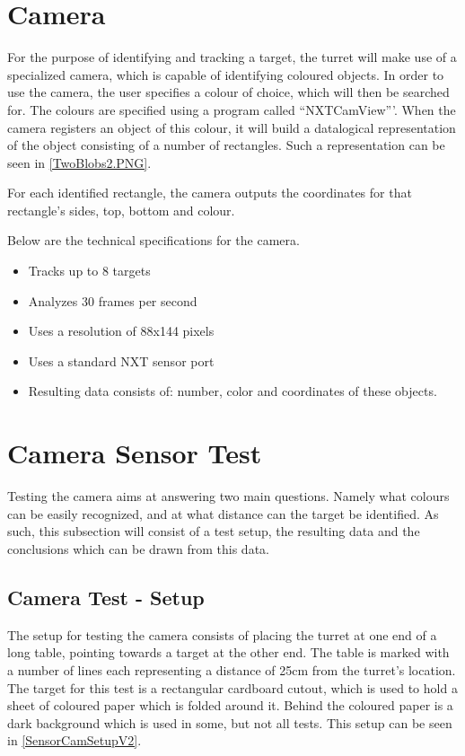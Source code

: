 \section{Camera}\label{SensorTheory}
For the purpose of identifying and tracking a target, the turret will
make use of a specialized camera, which is capable of identifying coloured
objects. In order to use the camera, the user specifies a colour of choice,
which will then be searched for. The colours are specified using a program
called ``NXTCamView'''. When the camera registers an object of this colour, it will
build a datalogical representation of the object consisting of a number of
rectangles. Such a representation can be seen in \autoref{TwoBlobs2.PNG}.


For each identified rectangle, the camera outputs the coordinates for that
rectangle's sides, top, bottom and colour. 

Below are the technical specifications \citep[p. 1]{NXTCam} for the camera.
\begin{itemize}
  \item Tracks up to 8 targets
  \item Analyzes 30 frames per second
  \item Uses a resolution of 88x144 pixels
  \item Uses a standard NXT sensor port
  \item Resulting data consists of: number, color and coordinates of these
  objects.
\end{itemize}

\section{Camera Sensor Test}\label{CamTest}%
Testing the camera aims at answering two main questions. Namely
what colours can be easily recognized, and at what distance can the target be
identified. As such, this subsection will consist of a test setup, the resulting
data and the conclusions which can be drawn from this data.

\subsection{Camera Test - Setup}\label{CamTestSetup}
The setup for testing the camera consists of placing the turret at one end of a
long table, pointing towards a target at the other end. The table is marked with
a number of lines each representing a distance of 25cm from the turret's
location. The target for this test is a rectangular cardboard cutout, which is
used to hold a sheet of coloured paper which is folded around it. Behind the
coloured paper is a dark background which is used in some, but not all
tests.
This setup can be seen in \autoref{SensorCamSetupV2}.


